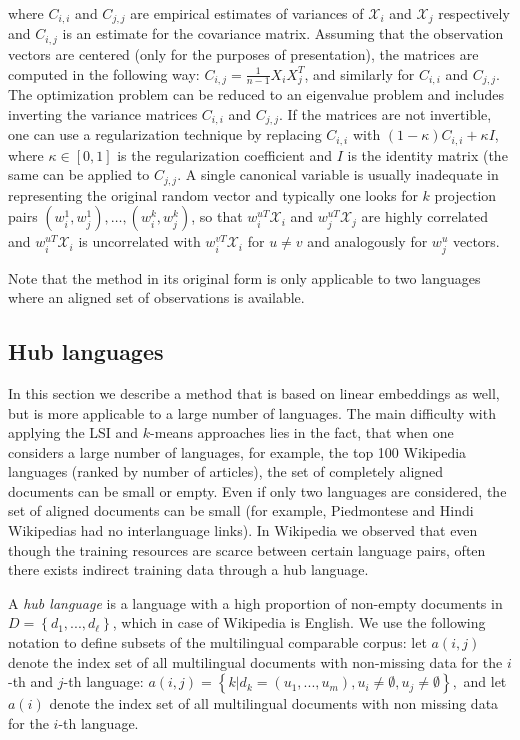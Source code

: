 \documentclass[twoside,11pt]{article}
\begin{document}
where $C_{i,i}$ and $C_{j,j}$ are empirical estimates of variances of $\mathcal{X}_i$ and $\mathcal{X}_j$ respectively and $C_{i,j}$ is an estimate for the covariance matrix. Assuming that the observation vectors are centered (only for the purposes of presentation), the matrices are computed in the following way: $C_{i,j} = \frac{1}{n-1}X_i X_j^T$, and similarly for $C_{i,i}$ and $C_{j,j}$.
The optimization problem can be reduced to an eigenvalue problem and includes inverting the variance matrices $C_{i,i}$ and $C_{j,j}$. If the matrices are not invertible, one can use a regularization technique by replacing $C_{i,i}$ with $(1- \kappa)C_{i,i} + \kappa I$, where $\kappa \in [0,1]$ is the regularization coefficient and $I$ is the identity matrix (the same can be applied to $C_{j,j}$.
A single canonical variable is usually inadequate in representing the original random vector and typically one looks for $k$ projection pairs $(w_i^1, w_j^1),\ldots,(w_i^k, w_j^k)$, so that $w_i^{uT} \mathcal{X}_i$ and $w_j^{uT} \mathcal{X}_j$ are highly correlated and $w_i^{uT} \mathcal{X}_i$ is uncorrelated with $w_i^{vT} \mathcal{X}_i$  for $u \neq v$ and analogously for $w_j^u$ vectors.

Note that the method in its original form is only applicable to two languages where an aligned set of observations is available.

\subsection{Hub languages}

In this section we describe a method that is based on linear embeddings as well, but is more applicable to a large number of languages. The main difficulty with applying the
LSI and $k$-means approaches lies in the fact, that when one considers a large number of languages, for example, the top 100 Wikipedia languages (ranked by number of articles), the set of completely
aligned documents can be small or empty. Even if only two languages are considered, the set of aligned documents can be small (for example, Piedmontese and Hindi
Wikipedias had no interlanguage links). In Wikipedia we observed that even though the training resources are scarce between certain language pairs, often there exists indirect training data
through a hub language.

A \emph{hub language} is a language with a high proportion of non-empty documents in $D = \left\{d_1,..., d_{\ell}\right\}$, which in case of Wikipedia is English. We use the following notation to define subsets of the multilingual comparable corpus: let $a(i,j)$ denote the index set of all multilingual documents with non-missing data for the $i$-th and $j$-th language:  $a(i,j) = \left\{k | d_k = (u_1,...,u_m), u_i \neq \emptyset, u_j \neq \emptyset \right\},$ and let $a(i)$ denote the index set of all multilingual documents with non missing data for the $i$-th language.
\end{document}
